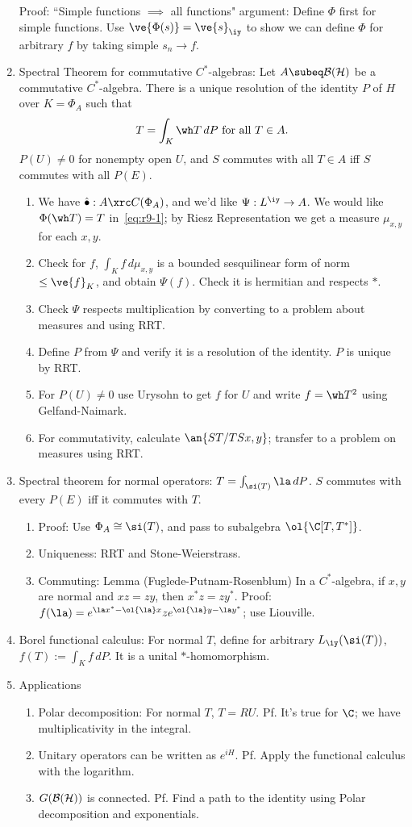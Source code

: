 \begin{enumerate}
Proof: ``Simple functions $\implies$ all functions" argument: Define $\Phi$ first for simple functions. Use $\ve{\Phi(s)}=\ve{s}_{\iy}$ to show we can define $\Phi$ for arbitrary $f$ by taking simple $s_n\to f$.
\item
Spectral Theorem for commutative $C^*$-algebras: Let $A\subeq \cal B(H)$ be a commutative $C^*$-algebra. There is a unique resolution of the identity $P$ of $H$ over $K=\Phi_A$ such that 
\[
T=\int_{K} \wh T\,dP\text{ for all }T\in A.
\]
$P(U)\ne 0$ for nonempty open $U$, and $S$ commutes with all $T\in A$ iff $S$ commutes with all $P(E)$.
\begin{enumerate}
\item
We have $\hat{\bullet}:A\xrc C(\Phi_A)$, and we'd like $\Psi:L^{\iy}\to A$. 
We would like $\Phi(\wh T)=T$ in~\eqref{eq:r9-1}; by Riesz Representation we get a measure $\mu_{x,y}$ for each $x,y$.
\item Check for $f$, $\int_K f\,d\mu_{x,y}$ is a bounded sesquilinear form of norm $\le\ve{f}_K$, and obtain $\Psi(f)$. Check it is hermitian and respects $*$.
\item Check $\Psi$ respects multiplication by converting to a problem about measures and using RRT.
\item Define $P$ from $\Psi$ and verify it is a resolution of the identity. $P$ is unique by RRT.
\item For $P(U)\ne 0$ use Urysohn to get $f$ for $U$ and write $f=\wh T^2$ using Gelfand-Naimark.
\item For commutativity, calculate $\an{ST/TSx,y}$; transfer to a problem on measures using RRT.
\end{enumerate}
\item Spectral theorem for normal operators: $T=\int_{\si(T)}\la \,dP$. $S$ commutes with every $P(E)$ iff it commutes with $T$.
\begin{enumerate}
\item
Proof: Use $\Phi_A\cong \si(T)$, and pass to subalgebra $\ol{\C[T,T^*]}$. 
\item
Uniqueness: RRT and Stone-Weierstrass.
\item
Commuting: Lemma (Fuglede-Putnam-Rosenblum) In a $C^*$-algebra, if $x,y$ are normal and $xz=zy$, then $x^*z=zy^*$. Proof: $f(\la)=e^{\la x^*-\ol{\la}x}ze^{\ol{\la}y-\la y^*}$; use Liouville.
\end{enumerate}
\item Borel functional calculus: For normal $T$, define for arbitrary $L_{\iy}(\si(T))$, $f(T):=\int_K f\,dP$. It is a unital $*$-homomorphism.
\item Applications
\begin{enumerate}
\item
Polar decomposition: For normal $T$, $T=RU$. Pf. It's true for $\C$; we have multiplicativity in the integral.
\item
Unitary operators can be written as $e^{iH}$. Pf. Apply the functional calculus with the logarithm.
\item
$G(\cal B(H))$ is connected. Pf. Find a path to the identity using Polar decomposition and exponentials.
\end{enumerate}
\end{enumerate}

